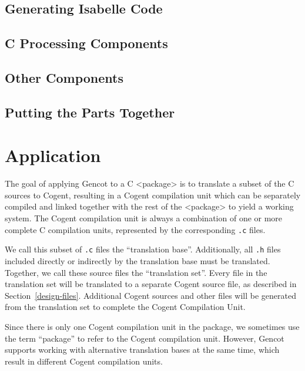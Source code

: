 \documentclass[a4paper]{report}
\newcommand{\code}[1]{\textnormal{\texttt{#1}}}
\begin{document}
\section{Generating Isabelle Code}
\label{impl-isabelle}


\section{C Processing Components}
\label{impl-ccomps}


\section{Other Components}
\label{impl-ocomps}


\section{Putting the Parts Together}
\label{impl-all}


\chapter{Application}

The goal of applying Gencot to a C <package> is to translate a subset of the C sources to Cogent,
resulting in a Cogent compilation unit which can be separately compiled and linked together with
the rest of the <package> to yield a working system. The Cogent compilation unit is always a
combination of one or more complete C compilation units, represented by the corresponding \code{.c} 
files.

We call this subset of \code{.c} files the ``translation base''. Additionally, all \code{.h} files
included directly or indirectly by the translation base must be translated. Together, we call these
source files the ``translation set''. Every file in the translation set will be translated to a 
separate Cogent source file, as described in Section~\ref{design-files}. Additional Cogent sources
and other files will be generated from the translation set to complete the Cogent Compilation Unit.

Since there is only one Cogent compilation unit in the package, we sometimes use the term ``package''
to refer to the Cogent compilation unit. However, Gencot supports working with alternative 
translation bases at the same time, which result in different Cogent compilation units.
\end{document}
